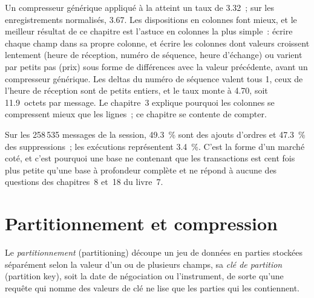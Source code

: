 Un compresseur générique appliqué à la  atteint un taux de 3.32~; sur les enregistrements normalisés, 3.67. Les dispositions en colonnes font mieux,
et le meilleur résultat de ce chapitre est l'astuce en colonnes la plus simple~: écrire chaque champ dans sa propre colonne, et écrire les colonnes dont
valeurs croissent lentement (heure de réception, numéro de séquence, heure d'échange) ou varient par petits pas (prix) sous forme de différences avec la
valeur précédente, avant un compresseur générique. Les deltas du numéro de séquence valent tous 1, ceux de l'heure de réception sont de petits
entiers, et le taux monte à 4.70, soit 11.9~octets par message. Le chapitre~3 explique pourquoi les colonnes se compressent mieux que les lignes~; ce
chapitre se contente de compter.

\label{lst:pl:capturing-and-storing-tick-data:delta}

\begin{remark}\label{rem:pl:capturing-and-storing-tick-data:mix}
Sur les 258\,535 messages de la session, 49.3~\% sont des ajouts d'ordres et 47.3~\% des suppressions~; les exécutions représentent 3.4~\%. C'est la forme d'un
marché coté, et c'est pourquoi une base ne contenant que les transactions est cent fois plus petite qu'une base à profondeur complète et ne répond à aucune des
questions des chapitres~8 et~18 du livre~7.
\end{remark}

\section{Partitionnement et compression}

\begin{definition}\label{def:pl:capturing-and-storing-tick-data:partition}
Le \emph{partitionnement} (partitioning) découpe un jeu de données en parties stockées séparément selon la valeur d'un ou de plusieurs champs, sa
\emph{clé de partition} (partition key), soit la date de négociation ou l'instrument, de sorte qu'une requête qui nomme des valeurs de clé ne lise que
les parties qui les contiennent.
\end{definition}

